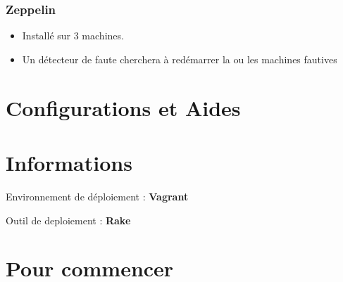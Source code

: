 \documentclass[a4paper,oneside,10pt]{article}
\begin{document}
\subsubsection{Zeppelin}

\begin{itemize}
\item Installé sur 3 machines. 
\item Un détecteur de faute cherchera à redémarrer la ou les machines fautives 
\end{itemize}

\section{Configurations et Aides}






\section{Informations}

Environnement de déploiement : \textbf{Vagrant}

Outil de deploiement : \textbf{Rake}

\section{Pour commencer}
\end{document}
